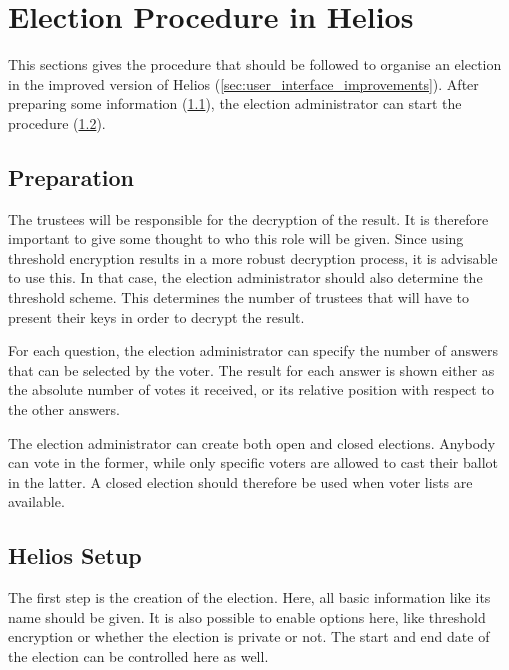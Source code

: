 %
%

\section{Election Procedure in Helios}
\label{sec:procedure}

This sections gives the procedure that should be followed to organise an election in the improved version of Helios (\ref{sec:user_interface_improvements}). After preparing some information (\ref{sec:proc:preparation}), the election administrator can start the procedure (\ref{sec:proc:helios}).

\subsection{Preparation}
\label{sec:proc:preparation}

The trustees will be responsible for the decryption of the result. It is therefore important to give some thought to who this role will be given. Since using threshold encryption results in a more robust decryption process, it is advisable to use this. In that case, the election administrator should also determine the threshold scheme. This determines the number of trustees that will have to present their keys in order to decrypt the result.

\par For each question, the election administrator can specify the number of answers that can be selected by the voter. The result for each answer is shown either as the absolute number of votes it received, or its relative position with respect to the other answers.

\par The election administrator can create both open and closed elections. Anybody can vote in the former, while only specific voters are allowed to cast their ballot in the latter. A closed election should therefore be used when voter lists are available.

\subsection{Helios Setup}
\label{sec:proc:helios}

The first step is the creation of the election. Here, all basic information like its name should be given. It is also possible to enable options here, like threshold encryption or whether the election is private or not. The start and end date of the election can be controlled here as well.

